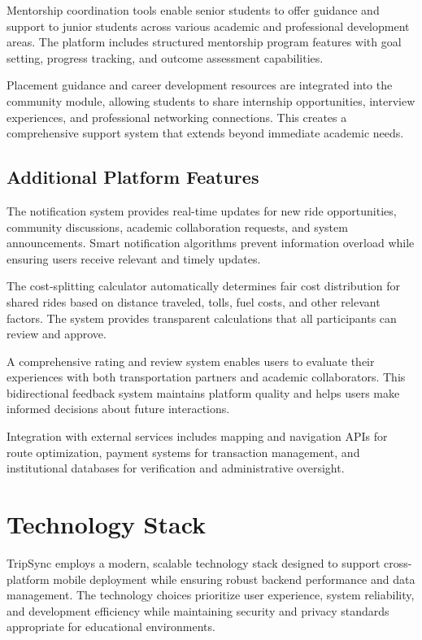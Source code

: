 \documentclass[conference]{IEEEtran}
\begin{document}
Mentorship coordination tools enable senior students to offer guidance and support to junior students across various academic and professional development areas. The platform includes structured mentorship program features with goal setting, progress tracking, and outcome assessment capabilities.

Placement guidance and career development resources are integrated into the community module, allowing students to share internship opportunities, interview experiences, and professional networking connections. This creates a comprehensive support system that extends beyond immediate academic needs.

\subsection{Additional Platform Features}

The notification system provides real-time updates for new ride opportunities, community discussions, academic collaboration requests, and system announcements. Smart notification algorithms prevent information overload while ensuring users receive relevant and timely updates.

The cost-splitting calculator automatically determines fair cost distribution for shared rides based on distance traveled, tolls, fuel costs, and other relevant factors. The system provides transparent calculations that all participants can review and approve.

A comprehensive rating and review system enables users to evaluate their experiences with both transportation partners and academic collaborators. This bidirectional feedback system maintains platform quality and helps users make informed decisions about future interactions.

Integration with external services includes mapping and navigation APIs for route optimization, payment systems for transaction management, and institutional databases for verification and administrative oversight.

\section{Technology Stack}

TripSync employs a modern, scalable technology stack designed to support cross-platform mobile deployment while ensuring robust backend performance and data management. The technology choices prioritize user experience, system reliability, and development efficiency while maintaining security and privacy standards appropriate for educational environments.
\end{document}
